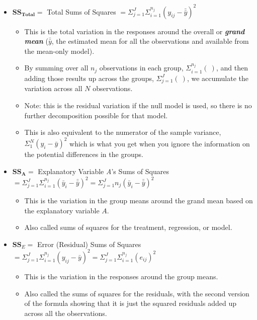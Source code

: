 \documentclass[]{book}
\begin{document}
\begin{itemize}
\item
  \(\textbf{SS}_{\textbf{Total}} =\) Total Sums of Squares
  \(= \Sigma^J_{j=1}\Sigma^{n_j}_{i=1}(y_{ij}-\bar{\bar{y}})^2\)

  \begin{itemize}
  \item
    This is the total variation in the responses around the overall or
    \textbf{\emph{grand mean}} (\(\bar{\bar{y}}\), the estimated mean
    for all the observations and available from the mean-only model).
  \item
    By summing over all \(n_j\) observations in each group,
    \(\Sigma^{n_j}_{i=1}(\ )\), and then adding those results up across
    the groups, \(\Sigma^J_{j=1}(\ )\), we accumulate the variation
    across all \(N\) observations.
  \item
    Note: this is the residual variation if the null model is used, so
    there is no further decomposition possible for that model.
  \item
    This is also equivalent to the numerator of the sample variance,
    \(\Sigma^{N}_{1}(y_{i}-\bar{y})^2\) which is what you get when you
    ignore the information on the potential differences in the groups.
  \end{itemize}
\item
  \(\textbf{SS}_{\textbf{A}} =\) Explanatory Variable \emph{A}'s Sums of
  Squares
  \(=\Sigma^J_{j=1}\Sigma^{n_j}_{i=1}(\bar{y}_{i}-\bar{\bar{y}})^2 =\Sigma^J_{j=1}n_j(\bar{y}_{i}-\bar{\bar{y}})^2\)

  \begin{itemize}
  \item
    This is the variation in the group means around the grand mean based
    on the explanatory variable \(A\).
  \item
    Also called sums of squares for the treatment, regression, or model.
  \end{itemize}
\item
  \(\textbf{SS}_E =\) Error (Residual) Sums of Squares
  \(=\Sigma^J_{j=1}\Sigma^{n_j}_{i=1}(y_{ij}-\bar{y})^2 =\Sigma^J_{j=1}\Sigma^{n_j}_{i=1}(e_{ij})^2\)

  \begin{itemize}
  \item
    This is the variation in the responses around the group means.
  \item
    Also called the sums of squares for the residuals, with the second
    version of the formula showing that it is just the squared residuals
    added up across all the observations.
  \end{itemize}
\end{itemize}
\end{document}
